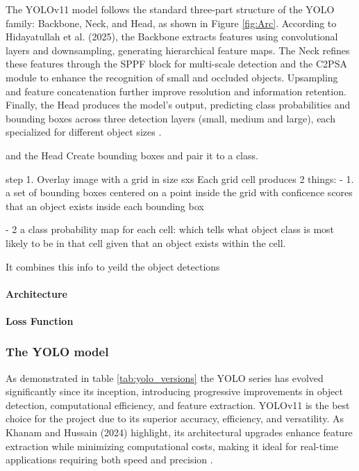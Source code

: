 \documentclass[a4paper,10pt,twocolumn]{article}
\numberwithin{figure}{section}
\numberwithin{table}{section}
\begin{document}
The YOLOv11 model follows the standard three-part structure of the YOLO family: 
Backbone, Neck, and Head, as shown in Figure \ref{fig:Arc}.
According to Hidayatullah et al. (2025), the Backbone extracts features using 
convolutional layers and downsampling, generating hierarchical feature maps.
The Neck refines these features through the SPPF block for multi-scale detection 
and the C2PSA module to enhance the recognition of small and occluded objects. 
Upsampling and feature concatenation further improve resolution and information 
retention. Finally, the Head produces the model’s output, predicting class probabilities 
and bounding boxes across three detection layers (small, medium and large), 
each specialized for different object sizes \citep{hidayatullah2025yolov8yolo11comprehensivearchitecture}.
\vspace{0.3cm}

and the Head 
Create bounding boxes and pair it to a class.

step 1. Overlay image with a grid in size sxs 
Each grid cell produces 2 things:
- 1. a set of bounding boxes centered on a point inside the grid
 with conficence scores that an object exists inside each bounding box 

 - 2 a class probability map for each cell: which tells what object class is most 
 likely to be in that cell given that an object exists within the cell.

It combines this info to yeild the object detections 

\paragraph{Architecture}


\paragraph{Loss Function}


\subsubsection{The YOLO model}
\vspace{0.3cm}
As demonstrated in table \ref{tab:yolo_versions} the YOLO series has
 evolved significantly since its inception, introducing progressive improvements
  in object detection, computational efficiency, and feature extraction. 
YOLOv11 is the best choice for the project due to its superior accuracy, 
efficiency, and versatility. As Khanam and Hussain (2024) highlight, 
its architectural upgrades enhance feature extraction while minimizing 
computational costs, making it ideal for real-time applications requiring 
both speed and precision \citep{khanam2024yolov11overviewkeyarchitectural}.
\end{document}
